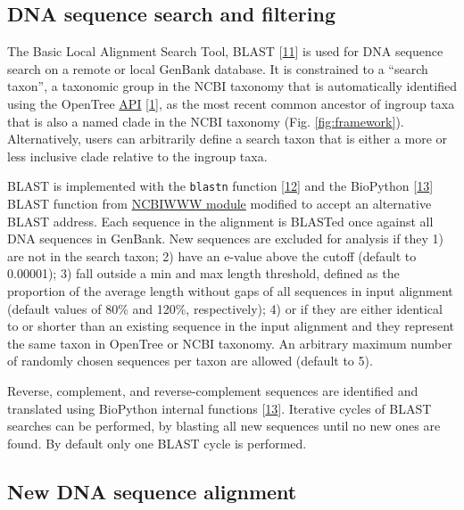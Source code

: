 \documentclass[]{article}
\begin{document}
\hypertarget{dna-sequence-search-and-filtering}{%
\subsection{DNA sequence search and filtering}\label{dna-sequence-search-and-filtering}}

The Basic Local Alignment Search Tool, BLAST {[}\protect\hyperlink{ref-altschul1990basic}{11}{]} is used for DNA sequence search on a remote or local GenBank database. It is constrained to a ``search taxon'', a taxonomic group in the NCBI taxonomy that is automatically identified using the OpenTree \href{https://github.com/OpenTreeOfLife/germinator/wiki/Taxonomy-API-v3\#mrca}{API} {[}\protect\hyperlink{ref-rees2017automated}{1}{]}, as the most recent common ancestor of ingroup taxa that is also a named clade in the NCBI taxonomy (Fig. \ref{fig:framework}).
Alternatively, users can arbitrarily define a search taxon that is either a more or less inclusive clade relative to the ingroup taxa.

BLAST is implemented with the \texttt{blastn} function {[}\protect\hyperlink{ref-camacho2009blast}{12}{]} and the BioPython {[}\protect\hyperlink{ref-cock2009biopython}{13}{]} BLAST function from \href{https://biopython.org/DIST/docs/api/Bio.Blast.NCBIWWW-module.html}{NCBIWWW module} modified to accept an alternative BLAST address.
Each sequence in the alignment is BLASTed once against all DNA sequences in GenBank.
New sequences are excluded for analysis if they 1) are not in the search taxon; 2) have an e-value above the cutoff (default to 0.00001); 3) fall outside a min and max length threshold, defined as the proportion of the average length without gaps of all sequences in input alignment (default values of 80\% and 120\%, respectively); 4) or if they are either identical to or shorter than an existing sequence in the input alignment and they represent the same taxon in OpenTree or NCBI taxonomy.
An arbitrary maximum number of randomly chosen sequences per taxon are allowed (default to 5).

Reverse, complement, and reverse-complement sequences are identified and translated using BioPython internal functions {[}\protect\hyperlink{ref-cock2009biopython}{13}{]}.
Iterative cycles of BLAST searches can be performed, by blasting all new sequences until no new ones are found. By default only one BLAST cycle is performed.

\hypertarget{new-dna-sequence-alignment}{%
\subsection{New DNA sequence alignment}\label{new-dna-sequence-alignment}}
\end{document}
